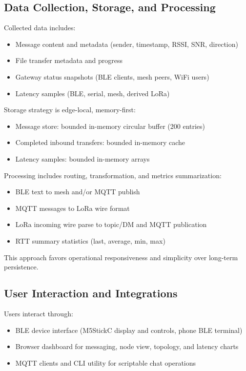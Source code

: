 \documentclass[conference]{IEEEtran}
\begin{document}
\subsection{Data Collection, Storage, and Processing}
Collected data includes:
\begin{itemize}
\item Message content and metadata (sender, timestamp, RSSI, SNR, direction)
\item File transfer metadata and progress
\item Gateway status snapshots (BLE clients, mesh peers, WiFi users)
\item Latency samples (BLE, serial, mesh, derived LoRa)
\end{itemize}

Storage strategy is edge-local, memory-first:
\begin{itemize}
\item Message store: bounded in-memory circular buffer (200 entries)
\item Completed inbound transfers: bounded in-memory cache
\item Latency samples: bounded in-memory arrays
\end{itemize}

Processing includes routing, transformation, and metrics summarization:
\begin{itemize}
\item BLE text to mesh and/or MQTT publish
\item MQTT messages to LoRa wire format
\item LoRa incoming wire parse to topic/DM and MQTT publication
\item RTT summary statistics (last, average, min, max)
\end{itemize}

This approach favors operational responsiveness and simplicity over long-term persistence.

\subsection{User Interaction and Integrations}
Users interact through:
\begin{itemize}
\item BLE device interface (M5StickC display and controls, phone BLE terminal)
\item Browser dashboard for messaging, node view, topology, and latency charts
\item MQTT clients and CLI utility for scriptable chat operations
\end{itemize}
\end{document}

